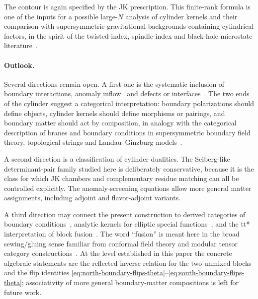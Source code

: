 \documentclass[11pt,a4paper]{article}
\numberwithin{equation}{section}
\theoremstyle{plain}
\theoremstyle{definition}
\theoremstyle{remark}
\begin{document}
The contour is again specified by the JK prescription. This finite-rank formula is one of the inputs for a possible large-\(N\) analysis of cylinder kernels and their comparison with supersymmetric gravitational backgrounds containing cylindrical factors, in the spirit of the twisted-index, spindle-index and black-hole microstate literature~\cite{Hosseini:2016tor,Hosseini:2019lkt,Hong:2018viz,Inglese:2023wky,Colombo:2024mts}.

 

\paragraph{Outlook.}

Several directions remain open.  A first one is the systematic inclusion of     boundary interactions, anomaly inflow~\cite{Callan:1984sa} and defects or interfaces~\cite{Dimofte:2017tpi}.  The two ends of the cylinder suggest a categorical interpretation: boundary polarizations should define objects, cylinder kernels should define morphisms or pairings, and boundary matter should act by composition, in analogy with the categorical description of branes and boundary conditions in supersymmetric boundary field theory, topological strings and Landau--Ginzburg models~\cite{Gaiotto:2008sa,Douglas:2000gi,Kapustin:2002bi,Herbst:2008jq}.

A second direction is a classification of cylinder dualities.  The Seiberg-like determinant-pair family studied here is deliberately conservative, because it is the class for which JK chambers and complementary residue matching can all be controlled explicitly.  The anomaly-screening equations allow more general matter assignments, including adjoint and flavor-adjoint variants.   

A third direction   may connect the present construction to derived categories of boundary conditions~\cite{Douglas:2000gi,Kapustin:2002bi,Herbst:2008jq}, analytic kernels for elliptic special functions~\cite{Felder:1999mq,Narukawa:2003}, and the tt* interpretation of block fusion~\cite{Cecotti:1991me,Cecotti:2013mba}.  The word ``fusion'' is meant here in the broad sewing/gluing sense familiar from conformal field theory and modular tensor category constructions~\cite{Moore:1988qv,Fuchs:2002cm}.  At the level established in this paper the concrete algebraic statements are the reflected inverse relation for the two unmixed blocks and the flip identities \eqref{eq:north-boundary-flips-theta}--\eqref{eq:south-boundary-flips-theta}; associativity of more general boundary-matter compositions is left for future work.
\end{document}
